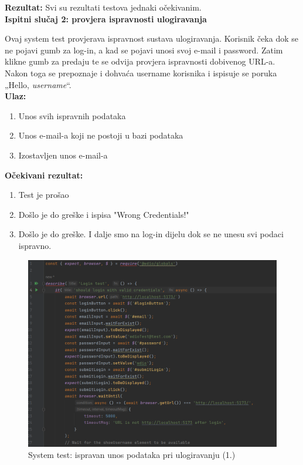 			\textbf{Rezultat:}
			Svi su rezultati testova jednaki očekivanim.\\
			
			\textbf{Ispitni slučaj 2: provjera ispravnosti ulogiravanja}
			
			Ovaj system test provjerava ispravnost sustava ulogiravanja. Korisnik čeka dok se ne pojavi gumb za log-in, a kad se pojavi unosi svoj e-mail i password. Zatim klikne gumb za predaju te se odvija provjera ispravnosti dobivenog URL-a. Nakon toga se prepoznaje i dohvaća username korisnika i ispisuje se poruka „Hello, \textit{username}“. \\
			
			\textbf{Ulaz:}
			
				\begin{enumerate}
					\item Unos svih ispravnih podataka
					\item Unos e-mail-a koji ne postoji u bazi podataka
					\item Izostavljen unos e-mail-a
				\end{enumerate}
				
			\textbf{Očekivani rezultat:}
			
				\begin{enumerate}
					\item Test je prošao
					\item Došlo je do greške i ispisa "Wrong Credentials!"
					\item Došlo je do greške. I dalje smo na log-in dijelu dok se ne unesu svi podaci ispravno.
				\end{enumerate}
			
			\begin{figure}[H]
				\includegraphics[scale=0.7]{slike/syslogin1.PNG} 
				\centering
				\caption{System test: ispravan unos podataka pri ulogiravanju (1.)}
				\label{dijagram_razmjestaja}
			\end{figure}
			
